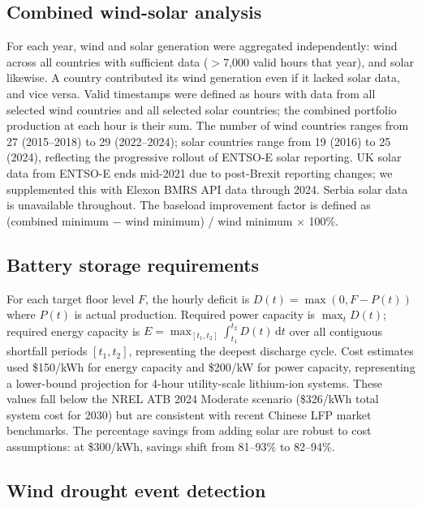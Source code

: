 \documentclass[sn-nature]{sn-jnl}%
\begin{document}
\subsection{Combined wind-solar analysis}

For each year, wind and solar generation were aggregated independently: wind across all countries with sufficient data ($>$7,000 valid hours that year), and solar likewise. A country contributed its wind generation even if it lacked solar data, and vice versa. Valid timestamps were defined as hours with data from all selected wind countries and all selected solar countries; the combined portfolio production at each hour is their sum. The number of wind countries ranges from 27 (2015--2018) to 29 (2022--2024); solar countries range from 19 (2016) to 25 (2024), reflecting the progressive rollout of ENTSO-E solar reporting. UK solar data from ENTSO-E ends mid-2021 due to post-Brexit reporting changes; we supplemented this with Elexon BMRS API data through 2024. Serbia solar data is unavailable throughout. The baseload improvement factor is defined as (combined minimum $-$ wind minimum) / wind minimum $\times$ 100\%.

\subsection{Battery storage requirements}

For each target floor level $F$, the hourly deficit is $D(t) = \max(0, F - P(t))$ where $P(t)$ is actual production. Required power capacity is $\max_t D(t)$; required energy capacity is $E = \max_{[t_1,t_2]} \int_{t_1}^{t_2} D(t)\,\mathrm{d}t$ over all contiguous shortfall periods $[t_1, t_2]$, representing the deepest discharge cycle. Cost estimates used \$150/kWh for energy capacity and \$200/kW for power capacity, representing a lower-bound projection for 4-hour utility-scale lithium-ion systems. These values fall below the NREL ATB 2024 Moderate scenario (\$326/kWh total system cost for 2030) \cite{nrel2024} but are consistent with recent Chinese LFP market benchmarks. The percentage savings from adding solar are robust to cost assumptions: at \$300/kWh, savings shift from 81--93\% to 82--94\%.

\subsection{Wind drought event detection}
\end{document}
